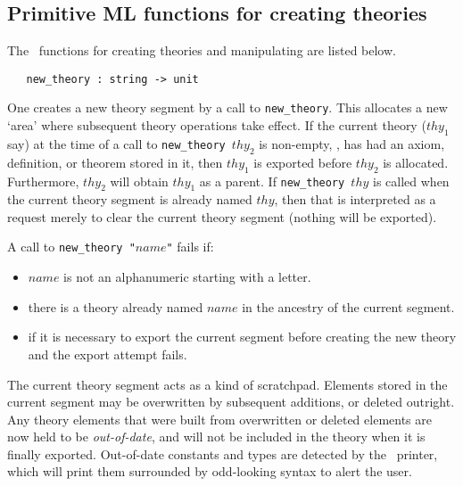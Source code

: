 \subsection{Primitive ML functions for creating theories}
\label{theoryprims}

The \ML\ functions for creating theories and manipulating
are listed below.

\begin{boxed}
\begin{verbatim}
   new_theory : string -> unit
\end{verbatim}\end{boxed}

\noindent One creates a new theory segment by a call to
\verb+new_theory+.  This allocates a new `area' where subsequent theory
operations take effect. If the current theory ($thy_1$ say) at the time
of a call to {\small\verb+new_theory +}$thy_2$ is non-empty, \ie, has
had an axiom, definition, or theorem stored in it, then $thy_1$ is
exported before $thy_2$ is allocated. Furthermore, $thy_2$ will obtain
$thy_1$ as a parent. If {\small\verb+new_theory +}$thy$ is called when
the current theory segment is already named $thy$, then that is
interpreted as a request merely to clear the current theory segment
(nothing will be exported).

A call to {\small\verb+new_theory "+}$name${\small\verb+"+} fails if:
\begin{itemize}

\item $name$ is not an alphanumeric starting with a letter.

\item there is a theory already named $name$ in the ancestry of the
current segment.

\item if it is necessary to export the current segment before creating
the new theory and the export attempt fails.

\end{itemize}

The current theory segment acts as a kind of scratchpad. Elements stored
in the current segment may be overwritten by subsequent additions, or
deleted outright. Any theory elements that were built from overwritten
or deleted elements are now held to be {\it out-of-date}, and will not
be included in the theory when it is finally exported.  Out-of-date
constants and types are detected by the \HOL\ printer, which will print
them surrounded by odd-looking syntax to alert the user.


